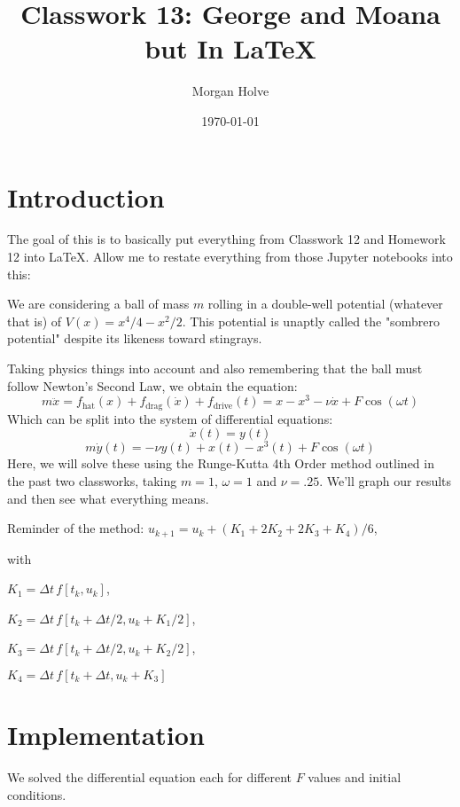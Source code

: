 \documentclass[aps,pra,notitlepage,amsmath,amssymb,letterpaper,12pt]{revtex4-1}
\begin{document}
 
\title{Classwork 13: George and Moana but In LaTeX}
\author{Morgan Holve}
\date{\today}

\maketitle

\section{Introduction} 
The goal of this is to basically put everything from Classwork 12 and Homework 12 into LaTeX. Allow me to restate everything from those Jupyter notebooks into this:

\vspace{5mm}
We are considering a ball of mass $m$ rolling in a double-well potential (whatever that is) of $V(x) = x^4/4 - x^2/2$. This potential is unaptly called the "sombrero potential" despite its likeness toward stingrays. 

\vspace{5mm}
Taking physics things into account and also remembering that the ball must follow Newton's Second Law, we obtain the equation:
$$m\ddot{x} = f_{\text{hat}}(x) + f_{\text{drag}}(\dot{x}) + f_{\text{drive}}(t) = x - x^3 - \nu \dot{x} + F\cos(\omega t)$$
Which can be split into the system of differential equations:
$$\dot{x}(t) = y(t)$$
$$m\dot{y}(t) = -\nu y(t) + x(t) - x^3(t) + F\cos(\omega t)$$
Here, we will solve these using the Runge-Kutta 4th Order method outlined in the past two classworks, taking $m = 1$, $\omega = 1$ and $\nu = .25$. We'll graph our results and then see what everything means. \par
\noindent
Reminder of the method:
$u_{k+1} = u_k + (K_1 + 2K_2 + 2K_3 + K_4)/6$, 
   
   with
   
   $K_1 = \Delta t\,f[t_k,u_k]$, 
   
   $K_2 = \Delta t\, f[t_k + \Delta t/2, u_k + K_1/2]$, 
   
   $K_3 = \Delta t\, f[t_k + \Delta t/2, u_k + K_2/2]$, 
   
   $K_4 = \Delta t\,f[t_k + \Delta t, u_k + K_3]$  
   

\section{Implementation}
We solved the differential equation each for different $F$ values and initial conditions.
\end{document}
